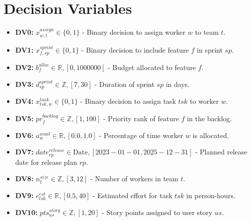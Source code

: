 \documentclass[11pt]{article}
\begin{document}
\section{Decision Variables}
\begin{itemize}
    \item \textbf{DV0:} $x^{assign}_{w,t} \in \{0,1\}$ - Binary decision to assign worker $w$ to team $t$.
    \item \textbf{DV1:} $x^{sprint}_{f,sp} \in \{0,1\}$ - Binary decision to include feature $f$ in sprint $sp$.
    \item \textbf{DV2:} $b^{alloc}_f \in \mathbb{R}, [0, 1000000]$ - Budget allocated to feature $f$.
    \item \textbf{DV3:} $d^{sprint}_{sp} \in \mathbb{Z}, [7, 30]$ - Duration of sprint $sp$ in days.
    \item \textbf{DV4:} $x^{task}_{tsk,w} \in \{0,1\}$ - Binary decision to assign task $tsk$ to worker $w$.
    \item \textbf{DV5:} $pr^{backlog}_f \in \mathbb{Z}, [1, 100]$ - Priority rank of feature $f$ in the backlog.
    \item \textbf{DV6:} $a^{avail}_w \in \mathbb{R}, [0.0, 1.0]$ - Percentage of time worker $w$ is allocated.
    \item \textbf{DV7:} $date^{release}_{rp} \in \text{Date}, [2023-01-01, 2025-12-31]$ - Planned release date for release plan $rp$.
    \item \textbf{DV8:} $n^{size}_t \in \mathbb{Z}, [3, 12]$ - Number of workers in team $t$.
    \item \textbf{DV9:} $e^{est}_{tsk} \in \mathbb{R}, [0.5, 40]$ - Estimated effort for task $tsk$ in person-hours.
    \item \textbf{DV10:} $pts^{story}_{us} \in \mathbb{Z}, [1, 20]$ - Story points assigned to user story $us$.
\end{itemize}
\end{document}
